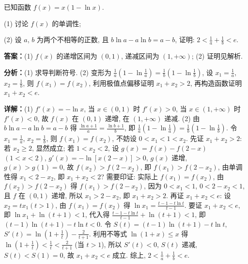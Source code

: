 \begin{question}[points=12]
已知函数 $f(x) = x(1 - \ln x)$.

(1) 讨论 $f(x)$ 的单调性;

(2) 设 $a$, $b$ 为两个不相等的正数, 且 $b\ln a - a\ln b = a - b$, 证明: $2 < \frac{1}{a} + \frac{1}{b} < e$.
\begin{solution}
\textbf{答案：}(1) $f(x)$ 的递增区间为 $(0,1)$, 递减区间为 $(1,+\infty)$; (2) 证明见解析.

\textbf{分析：}(1) 求导判断符号. (2) 变形为 $\frac{1}{a}(1-\ln\frac{1}{a}) = \frac{1}{b}(1-\ln\frac{1}{b})$, 设 $x_1 = \frac{1}{a}$, $x_2 = \frac{1}{b}$, 则 $f(x_1) = f(x_2)$, 利用极值点偏移证明 $x_1 + x_2 > 2$, 再构造函数证明 $x_1 + x_2 < e$.

\textbf{详解：}(1) $f'(x) = -\ln x$, 当 $x \in (0,1)$ 时 $f'(x) > 0$, 当 $x \in (1,+\infty)$ 时 $f'(x) < 0$, 故 $f(x)$ 在 $(0,1)$ 递增, 在 $(1,+\infty)$ 递减.
(2) 由 $b\ln a - a\ln b = a - b$ 得 $\frac{\ln a + 1}{a} = \frac{\ln b + 1}{b}$, 即 $\frac{1}{a}(1-\ln\frac{1}{a}) = \frac{1}{b}(1-\ln\frac{1}{b})$. 令 $x_1 = \frac{1}{a}$, $x_2 = \frac{1}{b}$, 则 $f(x_1) = f(x_2)$, 不妨设 $0 < x_1 < 1 < x_2$. 先证 $x_1 + x_2 > 2$: 若 $x_2 \geq 2$, 显然成立; 若 $1 < x_2 < 2$, 设 $g(x) = f(x) - f(2-x)$ $(1 < x < 2)$, $g'(x) = -\ln[x(2-x)] > 0$, $g(x)$ 递增, $g(x) > g(1) = 0$, 故 $f(x_2) > f(2-x_2)$, 即 $f(x_1) > f(2-x_2)$, 由单调性得 $x_1 < 2 - x_2$, 即 $x_1 + x_2 < 2$? 需要印证: 实际上 $f(x_1)=f(x_2)$, 由 $f(x_2) > f(2-x_2)$ 得 $f(x_1) > f(2-x_2)$, 因为 $0<x_1<1$, $0<2-x_2<1$, 且 $f$ 在 $(0,1)$ 递增, 所以 $x_1 > 2 - x_2$, 即 $x_1 + x_2 > 2$. 再证 $x_1 + x_2 < e$: 设 $x_2 = t x_1 (t>1)$, 由 $f(x_1)=f(x_2)$ 得 $\ln x_1 = \frac{t-1 - t\ln t}{t-1}$. 要证 $x_1 + x_2 < e$, 即 $\ln x_1 + \ln(t+1) < 1$, 代入得 $\frac{t-1 - t\ln t}{t-1} + \ln(t+1) < 1$, 即 $(t-1)\ln(t+1) - t\ln t < 0$. 令 $S(t) = (t-1)\ln(t+1) - t\ln t$, $S'(t) = \ln(1+\frac{1}{t}) - \frac{2}{t+1}$. 利用不等式 $\ln(1+x) \leq x$ 得 $\ln(1+\frac{1}{t}) < \frac{1}{t} < \frac{2}{t+1}$ (当 $t>1$), 所以 $S'(t) < 0$, $S(t)$ 递减, $S(t) < S(1) = 0$, 故 $x_1 + x_2 < e$ 成立. 综上, $2 < \frac{1}{a} + \frac{1}{b} < e$.
\end{solution}
\end{question}

